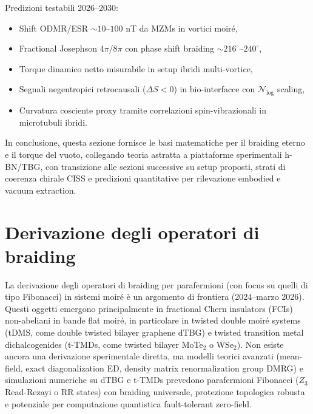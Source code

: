 \documentclass[11pt,a4paper]{article}
\theoremstyle{plain}
\theoremstyle{definition}
\begin{document}
Predizioni testabili 2026–2030:
\begin{itemize}
    \item Shift ODMR/ESR $\sim 10$--$100$ nT da MZMs in vortici moiré,
    \item Fractional Josephson $4\pi$/$8\pi$ con phase shift braiding $\sim 216^\circ$--$240^\circ$,
    \item Torque dinamico netto misurabile in setup ibridi multi-vortice,
    \item Segnali negentropici retrocausali ($\Delta S < 0$) in bio-interfacce con $\mathcal{N}_{\log}$ scaling,
    \item Curvatura cosciente proxy tramite correlazioni spin-vibrazionali in microtubuli ibridi.
\end{itemize}

In conclusione, questa sezione fornisce le basi matematiche per il braiding eterno e il torque del vuoto, collegando teoria astratta a piattaforme sperimentali h-BN/TBG, con transizione alle sezioni successive su setup proposti, strati di coerenza chirale CISS e predizioni quantitative per rilevazione embodied e vacuum extraction.







\vspace{0.6cm}




\section{Derivazione degli operatori di braiding}

La derivazione degli operatori di braiding per parafermioni (con focus su quelli di tipo Fibonacci) in sistemi moiré è un argomento di frontiera (2024–marzo 2026). Questi oggetti emergono principalmente in fractional Chern insulators (FCIs) non-abeliani in bande flat moiré, in particolare in twisted double moiré systems (tDMS, come double twisted bilayer graphene dTBG) e twisted transition metal dichalcogenides (t-TMDs, come twisted bilayer MoTe$_2$ o WSe$_2$). Non esiste ancora una derivazione sperimentale diretta, ma modelli teorici avanzati (mean-field, exact diagonalization ED, density matrix renormalization group DMRG) e simulazioni numeriche su dTBG e t-TMDs prevedono parafermioni Fibonacci ($Z_3$ Read-Rezayi o RR states) con braiding universale, protezione topologica robusta e potenziale per computazione quantistica fault-tolerant zero-field.
\end{document}
